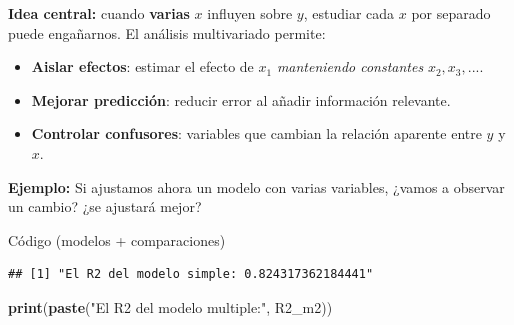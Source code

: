 \documentclass[
]{book}
\newenvironment{Shaded}{\begin{snugshade}}{\end{snugshade}}
\newcommand{\AttributeTok}[1]{\textcolor[rgb]{0.13,0.29,0.53}{#1}}
\newcommand{\CommentTok}[1]{\textcolor[rgb]{0.56,0.35,0.01}{\textit{#1}}}
\newcommand{\FunctionTok}[1]{\textcolor[rgb]{0.13,0.29,0.53}{\textbf{#1}}}
\newcommand{\NormalTok}[1]{#1}
\newcommand{\OtherTok}[1]{\textcolor[rgb]{0.56,0.35,0.01}{#1}}
\newcommand{\SpecialCharTok}[1]{\textcolor[rgb]{0.81,0.36,0.00}{\textbf{#1}}}
\newcommand{\StringTok}[1]{\textcolor[rgb]{0.31,0.60,0.02}{#1}}
\providecommand{\tightlist}{%
  \setlength{\itemsep}{0pt}\setlength{\parskip}{0pt}}
\begin{document}
\textbf{Idea central:} cuando \textbf{varias} \(x\) influyen sobre \(y\), estudiar cada \(x\) por separado puede engañarnos. El análisis multivariado permite:

\begin{itemize}
\tightlist
\item
  \textbf{Aislar efectos}: estimar el efecto de \(x_1\) \emph{manteniendo constantes} \(x_2,x_3,...\).
\item
  \textbf{Mejorar predicción}: reducir error al añadir información relevante.
\item
  \textbf{Controlar confusores}: variables que cambian la relación aparente entre \(y\) y \(x\).
\end{itemize}

\textbf{Ejemplo:} Si ajustamos ahora un modelo con varias variables, ¿vamos a observar un cambio? ¿se ajustará mejor?

Código (modelos + comparaciones)

\begin{Shaded}
\end{Shaded}

\begin{verbatim}
## [1] "El R2 del modelo simple: 0.824317362184441"
\end{verbatim}

\begin{Shaded}
\begin{Highlighting}[]
\FunctionTok{print}\NormalTok{(}\FunctionTok{paste}\NormalTok{(}\StringTok{"El R2 del modelo multiple:"}\NormalTok{, R2\_m2))}
\end{Highlighting}
\end{Shaded}
\end{document}
